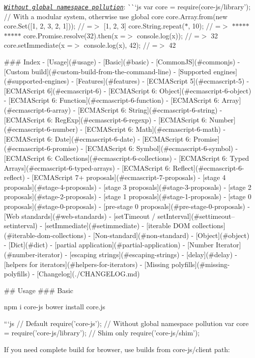 \href{http://goo.gl/paOHb0}{\tt {\itshape Without global namespace pollution}}\+: \`{}\`{}`js var core = require(\textquotesingle{}core-\/js/library'); // With a modular system, otherwise use global {\ttfamily core} core.\+Array.\+from(new core.\+Set(\mbox{[}1, 2, 3, 2, 1\mbox{]})); // =$>$ \mbox{[}1, 2, 3\mbox{]} core.\+String.\+repeat(\textquotesingle{}$\ast$\textquotesingle{}, 10); // =$>$ \textquotesingle{}$\ast$$\ast$$\ast$$\ast$$\ast$$\ast$$\ast$$\ast$$\ast$$\ast$\textquotesingle{} core.\+Promise.\+resolve(32).then(x =$>$ console.\+log(x)); // =$>$ 32 core.\+set\+Immediate(x =$>$ console.\+log(x), 42); // =$>$ 42 
\begin{DoxyCode}
### Index
- [Usage](#usage)
  - [Basic](#basic)
  - [CommonJS](#commonjs)
  - [Custom build](#custom-build-from-the-command-line)
- [Supported engines](#supported-engines)
- [Features](#features)
  - [ECMAScript 5](#ecmascript-5)
  - [ECMAScript 6](#ecmascript-6)
    - [ECMAScript 6: Object](#ecmascript-6-object)
    - [ECMAScript 6: Function](#ecmascript-6-function)
    - [ECMAScript 6: Array](#ecmascript-6-array)
    - [ECMAScript 6: String](#ecmascript-6-string)
    - [ECMAScript 6: RegExp](#ecmascript-6-regexp)
    - [ECMAScript 6: Number](#ecmascript-6-number)
    - [ECMAScript 6: Math](#ecmascript-6-math)
    - [ECMAScript 6: Date](#ecmascript-6-date)
    - [ECMAScript 6: Promise](#ecmascript-6-promise)
    - [ECMAScript 6: Symbol](#ecmascript-6-symbol)
    - [ECMAScript 6: Collections](#ecmascript-6-collections)
    - [ECMAScript 6: Typed Arrays](#ecmascript-6-typed-arrays)
    - [ECMAScript 6: Reflect](#ecmascript-6-reflect)
  - [ECMAScript 7+ proposals](#ecmascript-7-proposals)
    - [stage 4 proposals](#stage-4-proposals)
    - [stage 3 proposals](#stage-3-proposals)
    - [stage 2 proposals](#stage-2-proposals)
    - [stage 1 proposals](#stage-1-proposals)
    - [stage 0 proposals](#stage-0-proposals)
    - [pre-stage 0 proposals](#pre-stage-0-proposals)
  - [Web standards](#web-standards)
    - [setTimeout / setInterval](#settimeout--setinterval)
    - [setImmediate](#setimmediate)
    - [iterable DOM collections](#iterable-dom-collections)
  - [Non-standard](#non-standard)
    - [Object](#object)
    - [Dict](#dict)
    - [partial application](#partial-application)
    - [Number Iterator](#number-iterator)
    - [escaping strings](#escaping-strings)
    - [delay](#delay)
    - [helpers for iterators](#helpers-for-iterators)
- [Missing polyfills](#missing-polyfills)
- [Changelog](./CHANGELOG.md)

## Usage
### Basic
\end{DoxyCode}
 npm i core-\/js bower install core.\+js 
\begin{DoxyCode}
```js
// Default
require('core-js');
// Without global namespace pollution
var core = require('core-js/library');
// Shim only
require('core-js/shim');
\end{DoxyCode}
 If you need complete build for browser, use builds from {\ttfamily core-\/js/client} path\+: ~\newline

